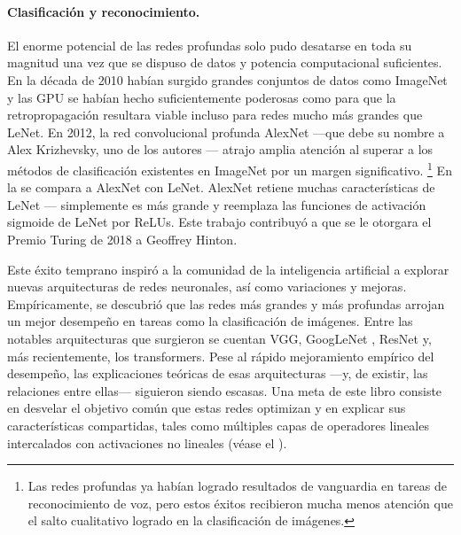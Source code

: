 \documentclass[../../book-main_es.tex]{subfiles}
\begin{document}
\paragraph{Clasificación y reconocimiento.}
El enorme potencial de las redes profundas solo pudo desatarse en toda su magnitud 
una vez que se dispuso de datos y potencia computacional suficientes. En la
década de 2010 habían surgido grandes conjuntos de datos como ImageNet y las GPU se habían
hecho suficientemente poderosas como para que la retropropagación resultara 
viable incluso para redes mucho más grandes que LeNet. En 2012, la red convolucional
profunda AlexNet ---que debe su nombre a Alex Krizhevsky, uno de los autores
\cite{krizhevsky2012imagenet}--- atrajo amplia atención al superar a los métodos
de clasificación existentes en ImageNet por un margen significativo.
\footnote{Las redes profundas ya habían logrado
    resultados de vanguardia en tareas de reconocimiento de voz, pero estos
    éxitos recibieron mucha menos atención que el salto cualitativo logrado en la clasificación
de imágenes.} En la  se compara a AlexNet con LeNet. AlexNet
retiene muchas características de LeNet --- simplemente es más grande y reemplaza
las funciones de activación sigmoide de LeNet por ReLUs. Este trabajo contribuyó a que
se le otorgara el Premio Turing de 2018 a Geoffrey Hinton.

Este éxito temprano inspiró a la comunidad de la inteligencia artificial a
explorar nuevas arquitecturas de redes neuronales, así como variaciones y mejoras.
Empíricamente, se descubrió que las redes más grandes y más
profundas arrojan un mejor desempeño en tareas como la clasificación de
imágenes. Entre las notables arquitecturas que surgieron se cuentan
VGG\cite{Simonyan15}, GoogLeNet \cite{Szegedy2014GoingDW}, ResNet
\cite{He2016-lc} y, más recientemente, los transformers\cite{vaswani2017attention}.
Pese al rápido mejoramiento empírico del desempeño, las explicaciones teóricas
de esas arquitecturas ---y, de existir, las relaciones entre ellas--- siguieron
siendo escasas. Una meta de este libro consiste en desvelar el objetivo común que
estas redes optimizan y en explicar sus características compartidas, tales
como múltiples capas de operadores lineales intercalados con activaciones no lineales
(véase el ).
\end{document}
